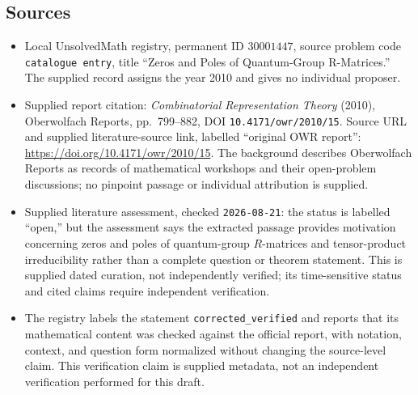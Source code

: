 \documentclass[11pt]{article}
\begin{document}
\subsection{Sources}
\begin{itemize}
\item Local UnsolvedMath registry, permanent ID \(30001447\), source problem code \texttt{catalogue entry}, title ``Zeros and Poles of Quantum-Group R-Matrices.'' The supplied record assigns the year 2010 and gives no individual proposer.
\item Supplied report citation: \emph{Combinatorial Representation Theory} (2010), Oberwolfach Reports, pp.~799--882, DOI \texttt{10.4171/owr/2010/15}. Source URL and supplied literature-source link, labelled ``original OWR report'': \url{https://doi.org/10.4171/owr/2010/15}. The background describes Oberwolfach Reports as records of mathematical workshops and their open-problem discussions; no pinpoint passage or individual attribution is supplied.
\item Supplied literature assessment, checked \texttt{2026-08-21}: the status is labelled ``open,'' but the assessment says the extracted passage provides motivation concerning zeros and poles of quantum-group \(R\)-matrices and tensor-product irreducibility rather than a complete question or theorem statement. This is supplied dated curation, not independently verified; its time-sensitive status and cited claims require independent verification.
\item The registry labels the statement \texttt{corrected\_verified} and reports that its mathematical content was checked against the official report, with notation, context, and question form normalized without changing the source-level claim. This verification claim is supplied metadata, not an independent verification performed for this draft.
\end{itemize}
\end{document}

